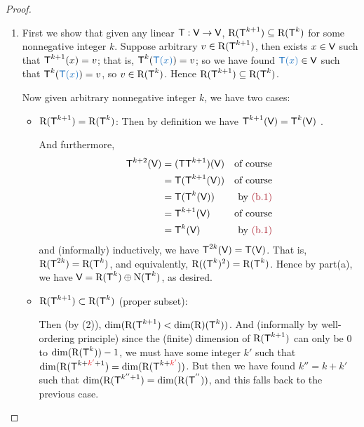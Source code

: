 \begin{proof}
\begin{enumerate}
\item
First we show that given any linear \(\textsf{T} : \textsf{V} \to \textsf{V}\), \(\mathrm{R}(\textsf{T}^{k + 1}) \subseteq \mathrm{R}(\textsf{T}^k)\) for some nonnegative integer \(k\).
Suppose arbitrary \(v \in \mathrm{R}(\textsf{T}^{k + 1})\), then exists \(x \in \textsf{V}\) such that \(\textsf{T}^{k + 1}(x) = v\);
that is, \(\T^k(\BLUE{\T(x)}) = v\);
so we have found \(\BLUE{\T(x)} \in \V\) such that \(\T^k(\BLUE{\T(x)}) = v\), so \(v \in \mathrm{R}(\textsf{T}^k)\).
Hence \(\mathrm{R}(\textsf{T}^{k + 1}) \subseteq \mathrm{R}(\textsf{T}^k)\).

Now given arbitrary nonnegative integer \(k\), we have two cases:
\begin{itemize}
    \item \(\mathrm{R}(\textsf{T}^{k + 1}) = \mathrm{R}(\textsf{T}^k)\): Then by definition we have \(\textsf{T}^{k + 1}(\textsf{V}) = \textsf{T}^k(\textsf{V})\) .
    
    And furthermore,
    \begin{align*}
        \T^{k + 2}(\V) & = (\T \T^{k+1})(\V) & \text{of course} \\
                      & = \T(\T^{k + 1}(\V)) & \text{of course} \\
                      & = \T(\T^k(\V)) & \text{by \MAROON{(b.1)}} \\
                      & = \T^{k + 1}(\V) & \text{of course} \\
                      & = \T^k(\V) & \text{by \MAROON{(b.1)}}
    \end{align*}
    and (informally) inductively, we have \(\textsf{T}^{2k}(\textsf{V}) = \textsf{T}(\textsf{V})\).
    That is, \(\mathrm{R}(\textsf{T}^{2k}) = \mathrm{R}(\textsf{T}^k)\), and equivalently, \(\mathrm{R}((\textsf{T}^k)^2) = \mathrm{R}(\textsf{T}^k)\).
    Hence by part(a), we have \(\textsf{V} = \mathrm{R}(\textsf{T}^k) \oplus \mathrm{N}(\textsf{T}^k)\), as desired.
    
    \item \(\mathrm{R}(\textsf{T}^{k + 1}) \subset \mathrm{R}(\textsf{T}^k)\) (proper subset):

    Then (by (2)), \(\dim(\mathrm{R}(\textsf{T}^{k + 1}) < \dim(\mathrm{R})(\textsf{T}^k))\).
    And (informally by well-ordering principle) since the (finite) dimension of \(\mathrm{R}(\textsf{T}^{k + 1})\) can only be \(0\) to \(\dim(\mathrm{R}(\textsf{T}^k)) - 1\), we must have some integer \(k'\) such that \(\dim(\RANGE(\T^{k + \RED{k'} + 1}) = \dim(\RANGE(\T^{k + \RED{k'}}))\).
    But then we have found \(k'' = k + k'\) such that \(\dim(\mathrm{R}(\textsf{T}^{k'' + 1}) = \dim(\mathrm{R}(\textsf{T}^{''}))\), and this falls back to the previous case.
\end{itemize}
\end{enumerate}
\end{proof}

